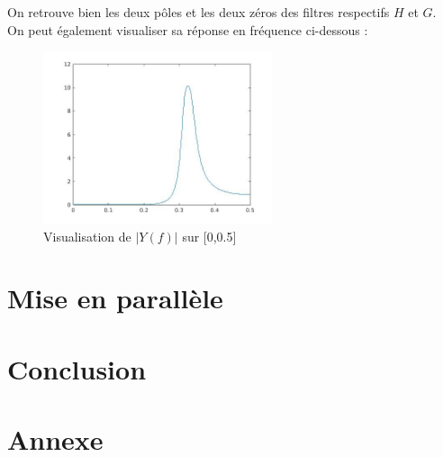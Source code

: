 \documentclass[12,french]{report}
\begin{document}
On retrouve bien les deux pôles et les deux zéros des filtres respectifs $H$ et $G$.\\

On peut également visualiser sa réponse en fréquence ci-dessous :

\begin{figure}[H]
	\center
	\includegraphics[width=0.6\textwidth]{./Images/freqz_HG}
	\caption{Visualisation de $|Y(f)|$ sur [0,0.5]}
\end{figure}\vspace{0.2cm}

\chapter{Mise en parallèle}


\chapter*{Conclusion}



\chapter*{Annexe}
\end{document}
